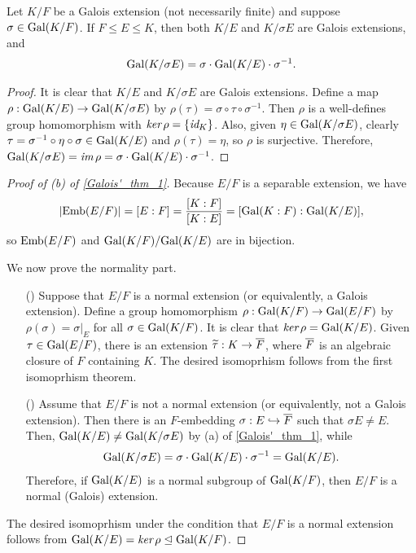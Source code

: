 \begin{prop}
    Let $K/F$ be a Galois extension (not necessarily finite) and suppose $\sigma\in{\textrm{Gal}({K/F})}$.
    If $F\leq E\leq K$, then both $K/E$ and $K/\sigma E$ are Galois extensions, and
    \begin{align*}
        {\textrm{Gal}({K/\sigma E})}=\sigma\cdot{\textrm{Gal}({K/E})}\cdot\sigma^{-1}.
    \end{align*}
\end{prop}
\begin{proof}
    It is clear that $K/E$ and $K/\sigma E$ are Galois extensions.
    Define a map $\rho: {\textrm{Gal}({K/E})}\rightarrow{\textrm{Gal}({K/\sigma E})}$ by $\rho(\tau)=\sigma\circ\tau\circ\sigma^{-1}$.
    Then $\rho$ is a well-defines group homomorphism with $\textit{ker\,}\rho=\{\textit{id}_{K}\}$.
    Also, given $\eta\in{\textrm{Gal}({K/\sigma E})}$, clearly $\tau=\sigma^{-1}\circ\eta\circ\sigma\in{\textrm{Gal}({K/E})}$ and $\rho(\tau)=\eta$, so $\rho$ is surjective.
    Therefore, ${\textrm{Gal}({K/\sigma E})}=\textit{im\,}\rho=\sigma\cdot{\textrm{Gal}({K/E})}\cdot\sigma^{-1}$.
\end{proof}
\begin{proof}[Proof of (b) of \cref{Galois'_thm_1}]
    Because $E/F$ is a separable extension, we have
    \begin{align*}
        |{\textrm{Emb}({E/F})}|=[E:F]=\frac{[K:F]}{[K:E]}=[{\textrm{Gal}({K:F})}: {\textrm{Gal}({K/E})}],
    \end{align*}
    so ${\textrm{Emb}({E/F})}$ and ${\textrm{Gal}({K/F})}/{\textrm{Gal}({K/E})}$ are in bijection.

    We now prove the normality part.
    \begin{enumerate}
        \item[(\romannumeral 1)]
        {
            Suppose that $E/F$ is a normal extension (or equivalently, a Galois extension).
            Define a group homomorphism $\rho: {\textrm{Gal}({K/F})}\rightarrow{\textrm{Gal}({E/F})}$ by $\rho(\sigma)=\sigma|_E$ for all $\sigma\in{\textrm{Gal}({K/F})}$.
            It is clear that $\textit{ker\,}\rho={\textrm{Gal}({K/E})}$.
            Given $\tau\in{\textrm{Gal}({E/F})}$, there is an extension $\widetilde\tau: K\rightarrow\overline{F}$, where $\overline{F}$ is an algebraic closure of $F$ containing $K$.
            The desired isomoprhism follows from the first isomoprhism theorem.
        }
        \item[(\romannumeral 2)]
        {
            Assume that $E/F$ is not a normal extension (or equivalently, not a Galois extension).
            Then there is an $F$-embedding $\sigma: E\hookrightarrow\overline{F}$ such that $\sigma E\neq E$.
            Then, ${\textrm{Gal}({K/E})}\neq{\textrm{Gal}({K/\sigma E})}$ by (a) of \cref{Galois'_thm_1}, while
            \begin{align*}
                {\textrm{Gal}({K/\sigma E})}=\sigma\cdot{\textrm{Gal}({K/E})}\cdot\sigma^{-1}={\textrm{Gal}({K/E})}.
            \end{align*}
            Therefore, if ${\textrm{Gal}({K/E})}$ is a normal subgroup of ${\textrm{Gal}({K/F})}$, then $E/F$ is a normal (Galois) extension.
        }
    \end{enumerate}
    The desired isomoprhism under the condition that $E/F$ is a normal extension follows from ${\textrm{Gal}({K/E})}=\textit{ker\,}\rho\trianglelefteq{\textrm{Gal}({K/F})}$.
\end{proof}

